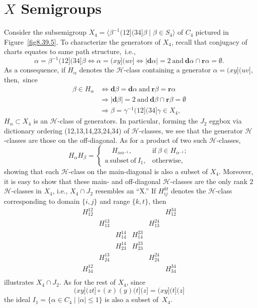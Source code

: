 \documentclass{surv-l}
\numberwithin{equation}{section}
\numberwithin{table}{section}
\numberwithin{figure}{section}
\theoremstyle{plain}
\theoremstyle{definition}
\begin{document}
\section{$X$ Semigroups}\label{sec7.29}

Consider the subsemigroup
$X_{4}=\langle\beta^{-1}(12](34]\beta \mid \beta\in S_{4}\rangle$ of
$C_{4}$ pictured in Figure~\ref{fig8.39.5}. To characterize the
generators of $X_{4}$, recall that conjugacy of charts equates to
same path structure,~i.e.,
\[
\alpha=\beta^{-1}(12](34]\beta\Leftrightarrow\alpha=(xy](uv]\Leftrightarrow|\mathbf{d}\alpha|=2\
\mathrm{and}\ \mathbf{d}\alpha\cap \mathbf{r}\alpha=\emptyset.
\]
As a consequence, if $H_{\alpha}$ denotes the $\mathcal{H}$-class
containing a generator $\alpha=(xy](uv]$, then,~since
\begin{align*}
\beta\in H_{\alpha}&\Leftrightarrow
\mathbf{d}\beta=\mathbf{d}\alpha\ \mathrm{and}\ \mathbf{r}\beta=\mathbf{r}\alpha \\
&\Rightarrow|\mathbf{d}\beta|=2\ \mathrm{and}\ \mathbf{d}\beta\cap
\mathbf{r}\beta=\emptyset \\
&\Rightarrow\beta=\gamma^{-1}(12](34]\gamma\in X_{4},
\end{align*}
$H_{\alpha}\subset X_{4}$ is an $\mathcal{H}$-class of generators.
In particular, forming the $J_{2}$ eggbox via dictionary ordering
(12,13,14,23,24,34) of $\mathcal{H}$-classes, we see that the
generator $\mathcal{H}$-classes are those on the off-diagonal. As
for a product of two such $\mathcal{H}$-classes,
\[
H_{\alpha}H_{\beta}=\begin{cases}
\quad H_{\alpha\alpha^{-1}}, &\mathrm{if}\ \beta\in H_{\alpha^{-1}};\\
\mathrm{a\ subset\ of}\ I_{1}, &\mathrm{otherwise},
\end{cases}
\]
showing that each $\mathcal{H}$-class on the main-diagonal is also
a subset of $X_{4}$. Moreover, it is easy to show that these main-
and off-diagonal $\mathcal{H}$-classes are the only rank 2
$\mathcal{H}$-classes in $X_{4}$, i.e., $X_{4}\cap J_{2}$
resembles an ``X.'' If $H_{ij}^{kt}$ denotes the
$\mathcal{H}$-class corresponding to domain $\{i,j\}$ and range
$\{k, t\}$, then
\[
\begin{matrix}
H_{12}^{12} & & & & &H_{12}^{34} \\
&H_{13}^{13} & & &H_{13}^{24} & \\
&&H_{14}^{14} &H_{14}^{23} & & \\
&&H_{23}^{14} &H_{23}^{23} & & \\
&H_{24}^{13} & & &H_{24}^{24} & \\
H_{34}^{12} & & & & &H_{34}^{34} \\
\end{matrix}
\]
illustrates $X_{4}\cap J_{2}$. As for the rest of $X_{4}$, since
\[
(xy](zt]\circ(x)(y)(t](z]=(xy](t](z]
\]
the ideal $I_{1}=\{\alpha\in C_{4}\mid |\alpha|\leq 1\}$ is
also a subset of~$X_{4}$.
\end{document}

